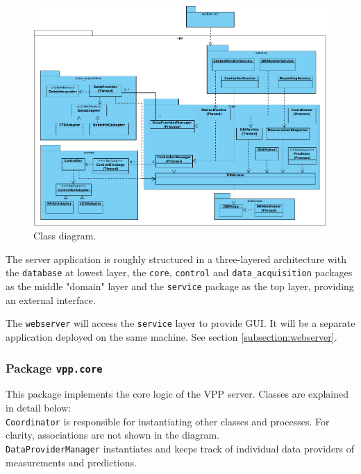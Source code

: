 \begin{figure}[H]
    \centering
    \includegraphics[width=\textwidth]{figures/class_diagram}
    \caption{Class diagram. }
    \label{figureClassDiagram}
\end{figure}

The server application is roughly structured in a three-layered architecture with the \texttt{database} at lowest layer, the \texttt{core}, \texttt{control} and \texttt{data\_acquisition} packages as the middle "domain" layer and the \texttt{service} package as the top layer, providing an external interface. 

The \texttt{webserver} will access the \texttt{service} layer to provide GUI. It will be a separate application deployed on the same machine. See section \ref{subsection:webserver}.

\subsubsection{Package \texttt{vpp.core}}
This package implements the core logic of the VPP server. Classes are explained in detail below:\\

\texttt{Coordinator} is responsible for instantiating other classes and processes. For clarity, associations are not shown in the diagram.\\

\texttt{DataProviderManager} instantiates and keeps track of individual data providers of measurements and predictions. \\

